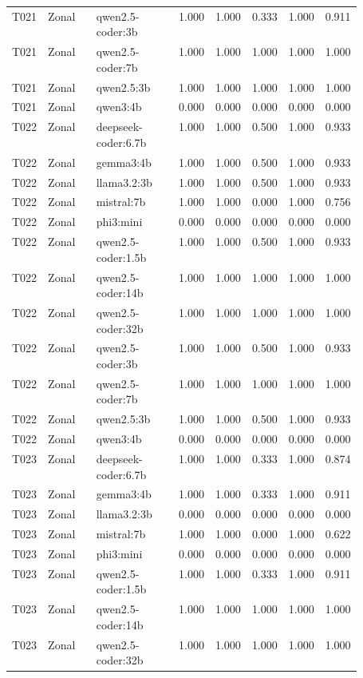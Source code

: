 \begin{longtable}{p{0.08\linewidth}p{0.16\linewidth}p{0.27\linewidth}rrrrr}
T021 & Zonal & qwen2.5-coder:3b & 1.000 & 1.000 & 0.333 & 1.000 & 0.911 \\
T021 & Zonal & qwen2.5-coder:7b & 1.000 & 1.000 & 1.000 & 1.000 & 1.000 \\
T021 & Zonal & qwen2.5:3b & 1.000 & 1.000 & 1.000 & 1.000 & 1.000 \\
T021 & Zonal & qwen3:4b & 0.000 & 0.000 & 0.000 & 0.000 & 0.000 \\
T022 & Zonal & deepseek-coder:6.7b & 1.000 & 1.000 & 0.500 & 1.000 & 0.933 \\
T022 & Zonal & gemma3:4b & 1.000 & 1.000 & 0.500 & 1.000 & 0.933 \\
T022 & Zonal & llama3.2:3b & 1.000 & 1.000 & 0.500 & 1.000 & 0.933 \\
T022 & Zonal & mistral:7b & 1.000 & 1.000 & 0.000 & 1.000 & 0.756 \\
T022 & Zonal & phi3:mini & 0.000 & 0.000 & 0.000 & 0.000 & 0.000 \\
T022 & Zonal & qwen2.5-coder:1.5b & 1.000 & 1.000 & 0.500 & 1.000 & 0.933 \\
T022 & Zonal & qwen2.5-coder:14b & 1.000 & 1.000 & 1.000 & 1.000 & 1.000 \\
T022 & Zonal & qwen2.5-coder:32b & 1.000 & 1.000 & 1.000 & 1.000 & 1.000 \\
T022 & Zonal & qwen2.5-coder:3b & 1.000 & 1.000 & 0.500 & 1.000 & 0.933 \\
T022 & Zonal & qwen2.5-coder:7b & 1.000 & 1.000 & 1.000 & 1.000 & 1.000 \\
T022 & Zonal & qwen2.5:3b & 1.000 & 1.000 & 0.500 & 1.000 & 0.933 \\
T022 & Zonal & qwen3:4b & 0.000 & 0.000 & 0.000 & 0.000 & 0.000 \\
T023 & Zonal & deepseek-coder:6.7b & 1.000 & 1.000 & 0.333 & 1.000 & 0.874 \\
T023 & Zonal & gemma3:4b & 1.000 & 1.000 & 0.333 & 1.000 & 0.911 \\
T023 & Zonal & llama3.2:3b & 0.000 & 0.000 & 0.000 & 0.000 & 0.000 \\
T023 & Zonal & mistral:7b & 1.000 & 1.000 & 0.000 & 1.000 & 0.622 \\
T023 & Zonal & phi3:mini & 0.000 & 0.000 & 0.000 & 0.000 & 0.000 \\
T023 & Zonal & qwen2.5-coder:1.5b & 1.000 & 1.000 & 0.333 & 1.000 & 0.911 \\
T023 & Zonal & qwen2.5-coder:14b & 1.000 & 1.000 & 1.000 & 1.000 & 1.000 \\
T023 & Zonal & qwen2.5-coder:32b & 1.000 & 1.000 & 1.000 & 1.000 & 1.000 \\

\end{longtable}
